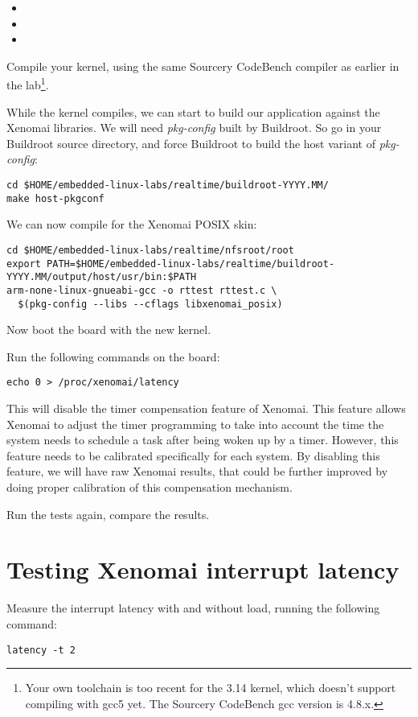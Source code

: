 \begin{itemize}
\item {}
\item {}
\item {}
\end{itemize}

Compile your kernel, using the same Sourcery CodeBench compiler
as earlier in the lab\footnote{Your own toolchain is too recent
for the 3.14 kernel, which doesn't support compiling with gcc5 yet. The
Sourcery CodeBench gcc version is 4.8.x.}. 

While the kernel compiles, we can start to build our application against
the Xenomai libraries. We will need {\em pkg-config} built by Buildroot.
So go in your Buildroot source directory, and force Buildroot to build
the host variant of {\em pkg-config}:

\begin{verbatim}
cd $HOME/embedded-linux-labs/realtime/buildroot-YYYY.MM/
make host-pkgconf
\end{verbatim}

We can now compile  for the Xenomai POSIX skin:

\scriptsize
\begin{verbatim}
cd $HOME/embedded-linux-labs/realtime/nfsroot/root
export PATH=$HOME/embedded-linux-labs/realtime/buildroot-YYYY.MM/output/host/usr/bin:$PATH
arm-none-linux-gnueabi-gcc -o rttest rttest.c \
  $(pkg-config --libs --cflags libxenomai_posix)
\end{verbatim}
\normalsize

Now boot the board with the new kernel.

Run the following commands on the board:

\begin{verbatim}
echo 0 > /proc/xenomai/latency
\end{verbatim}

This will disable the timer compensation feature of Xenomai. This
feature allows Xenomai to adjust the timer programming to take into
account the time the system needs to schedule a task after being woken
up by a timer. However, this feature needs to be calibrated
specifically for each system. By disabling this feature, we will have
raw Xenomai results, that could be further improved by doing proper
calibration of this compensation mechanism.

Run the tests again, compare the results.

\section{Testing Xenomai interrupt latency}

Measure the interrupt latency with and without load, running the
following command:

\begin{verbatim}
latency -t 2
\end{verbatim}
